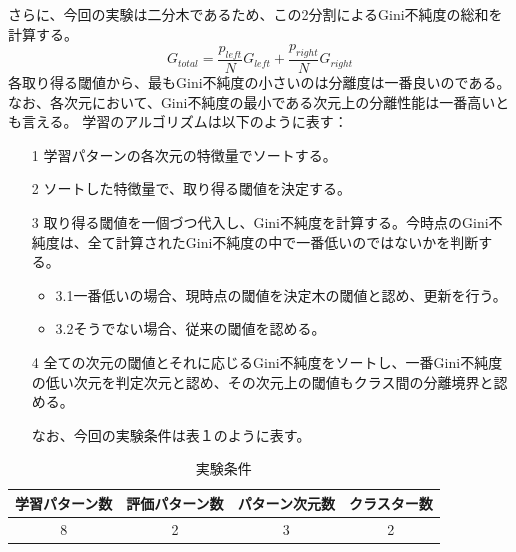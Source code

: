 \documentclass[ %
  uplatex,%
  papersize%
]{jsarticle}
\begin{document}
さらに、今回の実験は二分木であるため、この2分割によるGini不純度の総和を計算する。
$$G_{total}= \frac{p_{left}}{N}G_{left}+ \frac{p_{right}}{N}G_{right}  $$
各取り得る閾値から、最もGini不純度の小さいのは分離度は一番良いのである。なお、各次元において、Gini不純度の最小である次元上の分離性能は一番高いとも言える。
学習のアルゴリズムは以下のように表す：
\begin{itemize}
\footnotesize
\item[1] 学習パターンの各次元の特徴量でソートする。
\item[2] ソートした特徴量で、取り得る閾値を決定する。
\item[3] 取り得る閾値を一個づつ代入し、Gini不純度を計算する。今時点のGini不純度は、全て計算されたGini不純度の中で一番低いのではないかを判断する。
\begin{itemize}
\footnotesize
\item3.1一番低いの場合、現時点の閾値を決定木の閾値と認め、更新を行う。
\item3.2そうでない場合、従来の閾値を認める。
\end{itemize}
\item[4] 全ての次元の閾値とそれに応じるGini不純度をソートし、一番Gini不純度の低い次元を判定次元と認め、その次元上の閾値もクラス間の分離境界と認める。

なお、今回の実験条件は表１のように表す。
\end{itemize}
\begin{table}[h]\footnotesize
\caption{実験条件}
\label{}
\centering
\begin{tabular}{|c|c|c|c|}
\hline
学習パターン数&評価パターン数&パターン次元数&クラスター数\\
\hline
8&2&3&2\\
\hline
\end{tabular} 
\end{table}
\end{document}

